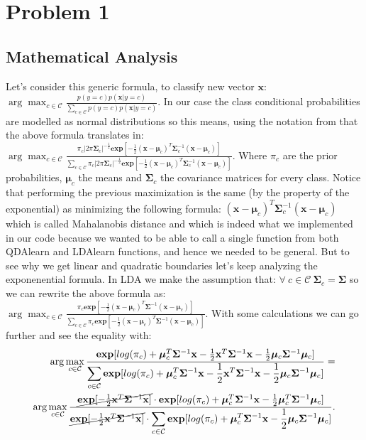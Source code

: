 \documentclass{article}
\begin{document}
\section{Problem 1}
\subsection{Mathematical Analysis}
Let's consider this generic formula, to classify new vector $\textbf{x}$:\\
$\displaystyle\arg\max_{c\in\mathcal{C}}\frac{p(y=c)p(\textbf{x}|y=c)}{\displaystyle\sum_{c\in \mathcal{C}}p(y=c)p(\textbf{x}|y=c) }$.
In our case the class conditional probabilities are modelled as normal distributions so this means, using the notation from \cite{} 
that the above formula translates in:\\
$\displaystyle\arg\max_{c\in\mathcal{C}}\frac{\pi_c|2\pi\bm{\Sigma}_c|^{-\frac{1}{2}}\textbf{exp}[-\frac{1}{2}(\textbf{x}-\bm{\mu}_c)^{T}\bm{\Sigma}^{-1}_c(\textbf{x}-\bm{\mu}_c)]}{\displaystyle\sum_{c\in\mathcal{C}}\pi_c|2\pi\bm{\Sigma}_c|^{-\frac{1}{2}}\textbf{exp}[-\frac{1}{2}(\textbf{x}-\bm{\mu}_c)^{T}\bm{\Sigma}^{-1}_c(\textbf{x}-\bm{\mu}_c)]}$. Where $\pi_c$ are the prior probabilities, $\bm{\mu}_c$ the means and $\bm{\Sigma}_c$ the covariance matrices for every class. Notice that performing the previous maximization is the same (by the property of the exponential) as minimizing
the following formula: $(\textbf{x}-\bm{\mu}_c)^{T}\bm{\Sigma}^{-1}_c(\textbf{x}-\bm{\mu}_c)$ which is called Mahalanobis distance and 
which is indeed what we implemented in our code because we wanted to be able to call a single function from both QDAlearn and LDAlearn functions, and 
hence we needed to be general.
But to see why we get linear and quadratic boundaries let's keep analyzing the exponenential formula.
In LDA we make the assumption that:  $\forall\ c\in\mathcal{C}\ \bm{\Sigma}_c=\bm{\Sigma}$ so we can rewrite the above formula as:\\
$\displaystyle\arg\max_{c\in\mathcal{C}}\frac{\pi_c\textbf{exp}[-\frac{1}{2}(\textbf{x}-\bm{\mu}_c)^{T}\bm{\Sigma}^{-1}(\textbf{x}-\bm{\mu}_c)]}{\displaystyle\sum_{c\in\mathcal{C}}\pi_c\textbf{exp}[-\frac{1}{2}(\textbf{x}-\bm{\mu}_c)^{T}\bm{\Sigma}^{-1}(\textbf{x}-\bm{\mu}_c)]}$.
With some calculations we can go further and see the equality with:
\begin{align}
\displaystyle\arg\max_{c\in\mathcal{C}}\frac{\textbf{exp}[log(\pi_c)+\bm{\mu}_c^T\bm{\Sigma}^{-1}\textbf{x}-\frac{1}{2}\textbf{x}^T\bm{\Sigma}^{-1}\textbf{x}-\frac{1}{2}\bm{\mu}_c\bm{\Sigma}^{-1}\bm{\mu}_c]}{\displaystyle\sum_{c\in \mathcal{C}}\textbf{exp}[log(\pi_c)+\bm{\mu}_c^T\bm{\Sigma}^{-1}\textbf{x}-\frac{1}{2}\textbf{x}^T\bm{\Sigma}^{-1}\textbf{x}-\frac{1}{2}\bm{\mu}_c\bm{\Sigma}^{-1}\bm{\mu}_c]}=\\
\displaystyle\arg\max_{c\in\mathcal{C}}\frac{\cancel{\textbf{exp}[-\frac{1}{2}\textbf{x}^T\bm{\Sigma}^{-1}\textbf{x}]}\cdot\textbf{exp}[log(\pi_c)+\bm{\mu}_c^T\bm{\Sigma}^{-1}\textbf{x}-\frac{1}{2}\bm{\mu}^T_c\bm{\Sigma}^{-1}\bm{\mu}_c]}{\cancel{\textbf{exp}[-\frac{1}{2}\textbf{x}^T\bm{\Sigma}^{-1}\textbf{x}]}\cdot\displaystyle\sum_{c\in \mathcal{C}}\textbf{exp}[log(\pi_c)+\bm{\mu}_c^T\bm{\Sigma}^{-1}\textbf{x}-\frac{1}{2}\bm{\mu}_c\bm{\Sigma}^{-1}\bm{\mu}_c]}.
\end{align}
\end{document}
